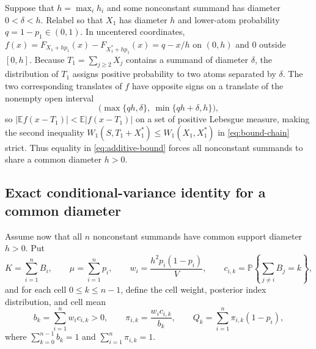 \documentclass[11pt]{article}
\numberwithin{equation}{section}
\theoremstyle{remark}
\newcommand{\E}{\mathbb E}
\newcommand{\Pp}{\mathbb P}
\begin{document}
Suppose that $h=\max_i h_i$ and some nonconstant summand has diameter
$0<\delta<h$. Relabel so that $X_1$ has diameter $h$ and lower-atom
probability $q=1-p_1\in(0,1)$. In uncentered coordinates,
$f(x)=F_{X_1+hp_1}(x)-F_{X_1^*+hp_1}(x)=q-x/h$ on $(0,h)$ and $0$ outside
$[0,h]$. Because $T_1=\sum_{j\ge2}X_j$ contains a summand of diameter
$\delta$, the distribution of $T_1$ assigns positive probability to two atoms
separated by $\delta$. The two corresponding translates of $f$ have opposite
signs on a translate of the nonempty open interval
\[
                    \bigl(\max\{qh,\delta\},\ \min\{qh+\delta,h\}\bigr),
\]
so $|\E f(x-T_1)|<\E|f(x-T_1)|$ on a set of positive Lebesgue measure, making
the second inequality $W_1(S,T_1+X_1^*)\le W_1(X_1,X_1^*)$ in
\eqref{eq:bound-chain} strict. Thus equality in \eqref{eq:additive-bound}
forces all nonconstant summands to share a common diameter $h>0$.

\subsection{Exact conditional-variance identity for a common diameter}\label{sec:posterior}

Assume now that all $n$ nonconstant summands have common support diameter
$h>0$. Put
\[
 K=\sum_{i=1}^n B_i,\qquad \mu=\sum_{i=1}^n p_i,\qquad
 w_i=\frac{h^2p_i(1-p_i)}V,\qquad
 c_{i,k}=\Pp\left\{\sum_{j\ne i}B_j=k\right\},
\]
and for each cell $0\le k\le n-1$, define the cell weight, posterior index
distribution, and cell mean
\begin{equation}\label{eq:posterior-weights}
 b_k=\sum_{i=1}^n w_i c_{i,k}>0,\qquad
 \pi_{i,k}=\frac{w_i c_{i,k}}{b_k},\qquad
 Q_k=\sum_{i=1}^n\pi_{i,k}(1-p_i),
\end{equation}
where $\sum_{k=0}^{n-1}b_k=1$ and $\sum_{i=1}^n\pi_{i,k}=1$.
\end{document}

